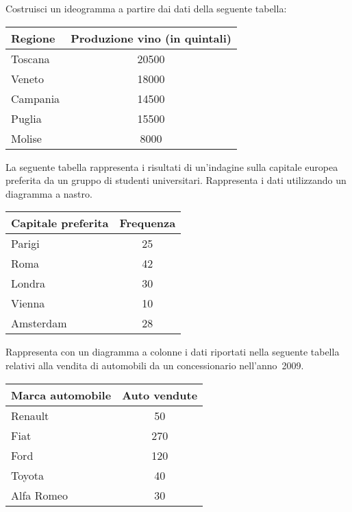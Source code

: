 \begin{esercizio}
\label{ese:A.14}
Costruisci un ideogramma a partire dai dati della seguente tabella:
\begin{center}
\begin{tabular}{lc}
\toprule
Regione & Produzione vino (in quintali)\\
\midrule
Toscana & 20500\\
Veneto & 18000\\
Campania & 14500\\
Puglia & 15500\\
Molise & 8000\\
\bottomrule
\end{tabular}
\end{center}

\end{esercizio}

\begin{esercizio}
\label{ese:A.15}
La seguente tabella rappresenta i risultati di un'indagine sulla capitale 
europea preferita da un gruppo di studenti universitari.
Rappresenta i dati utilizzando un diagramma a nastro.
\begin{center}
\begin{tabular}{lc}
\toprule
Capitale preferita & Frequenza\\
\midrule
Parigi & 25\\
Roma & 42\\
Londra & 30\\
Vienna & 10\\
Amsterdam & 28\\
\bottomrule
\end{tabular}
\end{center}
\end{esercizio}

\begin{esercizio}
\label{ese:A.16}
Rappresenta con un diagramma a colonne i dati riportati nella seguente 
tabella relativi alla vendita di automobili da un concessionario 
nell'anno~2009.
\begin{center}
\begin{tabular}{lc}
\toprule
Marca automobile & Auto vendute\\
\midrule
Renault & 50\\
Fiat & 270\\
Ford & 120\\
Toyota & 40\\
Alfa Romeo & 30\\
\bottomrule
\end{tabular}
\end{center}
\end{esercizio}

